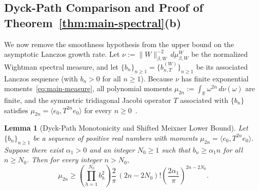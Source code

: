 \documentclass[11pt,a4paper]{article}
\numberwithin{equation}{section}
\theoremstyle{plain}
\newtheorem{lemma}[theorem]{Lemma}
\theoremstyle{definition}
\begin{document}
\subsection{Dyck-Path Comparison and Proof of Theorem~\ref{thm:main-spectral}(b)}\label{subsec:dyck}

We now remove the smoothness hypothesis from the upper bound on the asymptotic Lanczos growth rate. Let $\nu := \|W\|_{\beta,W}^{-2}\,d\mu_{\beta,W}^W$ be the normalized Wightman spectral measure, and let $\{b_n\}_{n\ge 1} = \{b_{n,T}^{(W)}\}_{n\ge 1}$ be its associated Lanczos sequence (with $b_n > 0$ for all $n\ge 1$). Because $\nu$ has finite exponential moments~\eqref{eq:main-measure}, all polynomial moments $\mu_{2n} := \int_{\mathbb{R}}\omega^{2n}\,d\nu(\omega)$ are finite, and the symmetric tridiagonal Jacobi operator $T$ associated with $\{b_n\}$ satisfies $\mu_{2n} = \langle e_0, T^{2n} e_0\rangle$ for every $n\ge 0$~\cite{Chihara1978}.

\begin{lemma}[Dyck-Path Monotonicity and Shifted Meixner Lower Bound]\label{lem:dyck-meixner}
Let $\{b_n\}_{n\ge 1}$ be a sequence of positive real numbers with moments $\mu_{2n} = \langle e_0, T^{2n} e_0\rangle$. Suppose there exist $\alpha_1 > 0$ and an integer $N_0 \ge 1$ such that $b_n \ge \alpha_1 n$ for all $n\ge N_0$. Then for every integer $n > N_0$,
\begin{equation}\label{eq:dyck-lower}
  \mu_{2n} \ge \left(\prod_{h=1}^{N_0} b_h^2\right)\frac{2}{\pi}\,(2n-2N_0)!\left(\frac{2\alpha_1}{\pi}\right)^{2n-2N_0}.
\end{equation}
\end{lemma}
\end{document}

